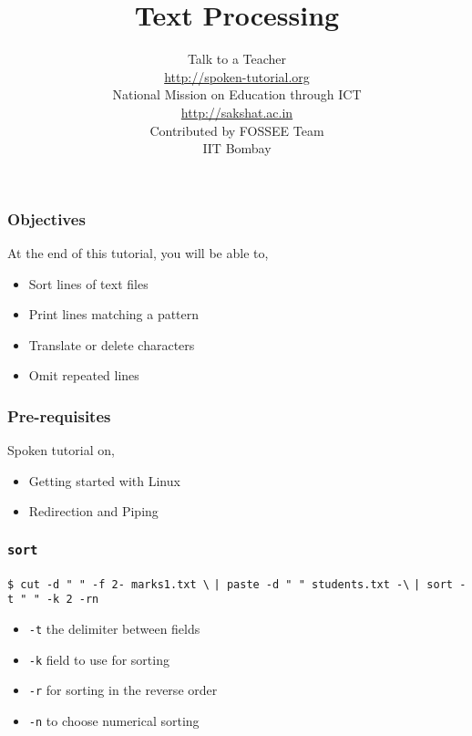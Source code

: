 \documentclass[17pt,compress]{beamer}
\author[FOSSEE]{}
\institute[IIT Bombay]{}
\date[]{}
\begin{document}
\sffamily \bfseries
\title
[Text Processing]
{Text Processing}
\author
[FOSSEE]
{\small Talk to a Teacher\\{\color{blue}\url{http://spoken-tutorial.org}}\\\vspace{0.25cm}National Mission on Education
 through ICT\\{\color{blue}\url{ http://sakshat.ac.in}} \\ [1.65cm]
   Contributed by FOSSEE Team \\IIT Bombay  \\[0.3cm]
}

\begin{frame}
   \titlepage
\end{frame}

\begin{frame}
\frametitle{Objectives}
\label{sec-2}

At the end of this tutorial, you will be able to,
\begin{itemize}
\item Sort lines of text files
\item Print lines matching a pattern
\item Translate or delete characters
\item Omit repeated lines
\end{itemize}
\end{frame}

\begin{frame}
\frametitle{Pre-requisites}
\label{sec-3}

Spoken tutorial on,
\begin{itemize}
\item Getting started with Linux
\item Redirection and Piping
\end{itemize}
\end{frame}

\begin{frame}[fragile]
  \frametitle{\texttt{sort}}
\verb~$ cut -d " " -f 2- marks1.txt \~
\verb~| paste -d " " students.txt -\~      
\verb~| sort -t " " -k 2 -rn~      
  \begin{itemize}
  \item \texttt{-t} the delimiter between fields
  \item \texttt{-k} field to use for sorting
  \item \texttt{-r} for sorting in the reverse order
  \item \texttt{-n} to choose numerical sorting
  \end{itemize}
\end{frame}
\end{document}
